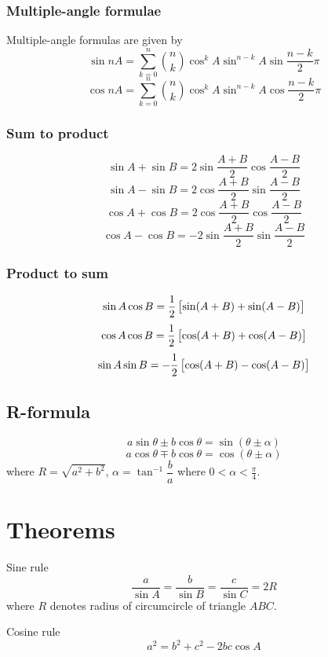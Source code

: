 \subsubsection{Multiple-angle formulae}
Multiple-angle formulas are given by
\[ \sin nA = \sum_{k=0}^n \binom{n}{k} \cos^kA \sin^{n-k}A \sin\frac{n-k}{2}\pi \]
\[ \cos nA = \sum_{k=0}^n \binom{n}{k} \cos^kA \sin^{n-k}A \cos\frac{n-k}{2}\pi \]

\subsubsection{Sum to product}
\[ \sin A + \sin B = 2 \sin \frac{A+B}{2} \cos \frac{A-B}{2} \]
\[ \sin A - \sin B = 2 \cos \frac{A+B}{2} \sin \frac{A-B}{2} \]
\[ \cos A + \cos B = 2 \cos \frac{A+B}{2} \cos \frac{A-B}{2} \]
\[ \cos A - \cos B = -2 \sin \frac{A+B}{2} \sin \frac{A-B}{2} \]

\subsubsection{Product to sum}
\[ \sin A \cos B = \frac{1}{2}\left[\sin(A+B)+\sin(A-B)\right] \]
\[ \cos A \cos B = \frac{1}{2}\left[\cos(A+B)+\cos(A-B)\right] \]
\[ \sin A \sin B = -\frac{1}{2}\left[\cos(A+B)-\cos(A-B)\right] \]

\subsection{R-formula}
\[ a \sin \theta \pm b \cos \theta = \sin (\theta \pm \alpha) \]
\[ a \cos \theta \mp b \cos \theta = \cos (\theta \pm \alpha) \]
where $R = \sqrt{a^2 + b^2}$,
$\alpha = \tan^{-1} \dfrac{b}{a}$ where $0 < \alpha < \frac{\pi}{4}$.

\section{Theorems}
\begin{thrm}{Sine rule}{} 
\begin{equation}
\frac{a}{\sin A} = \frac{b}{\sin B} = \frac{c}{\sin C} = 2R
\end{equation} 
where $R$ denotes radius of circumcircle of triangle $ABC$. 
\end{thrm}

\begin{thrm}{Cosine rule}{} 
\begin{equation}
a^2 = b^2 + c^2 - 2bc \cos A
\end{equation} 
\end{thrm}

